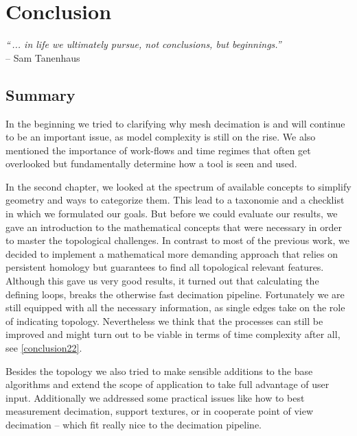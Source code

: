 \chapter{Conclusion}
\label{conclusion0}

\begin{flushright}
\textit{``\,... in life we ultimately pursue, not conclusions, but beginnings.''}\\
-- Sam Tanenhaus \citep[American historian, in:][]{Tanenhaus1986}
\end{flushright}

\section{Summary}
\label{conclusion1}

In the beginning we tried to clarifying why mesh decimation is and will continue to be an important issue, as model complexity is still on the rise.
We also mentioned the importance of work-flows and time regimes that often get overlooked but fundamentally determine how a tool is seen and used.

In the second chapter, we looked at the spectrum of available concepts to simplify geometry and ways to categorize them.
This lead to a taxonomie and a checklist in which we formulated our goals.
But before we could evaluate our results, we gave an introduction to the mathematical concepts that were necessary in order to master the topological challenges.
In contrast to most of the previous work, we decided to implement a mathematical more demanding approach that relies on persistent homology but guarantees to find all topological relevant features.\\
Although this gave us very good results, it turned out that calculating the defining loops, breaks the otherwise fast decimation pipeline.
Fortunately we are still equipped with all the necessary information, as single edges take on the role of indicating topology.
Nevertheless we think that the processes can still be improved and might turn out to be viable in terms of time complexity after all, see \ref{conclusion22}.

Besides the topology we also tried to make sensible additions to the base algorithms and extend the scope of application to take full advantage of user input.
Additionally we addressed some practical issues like how to best measurement decimation, support textures, or in cooperate point of view decimation -- which fit really nice to the decimation pipeline.

